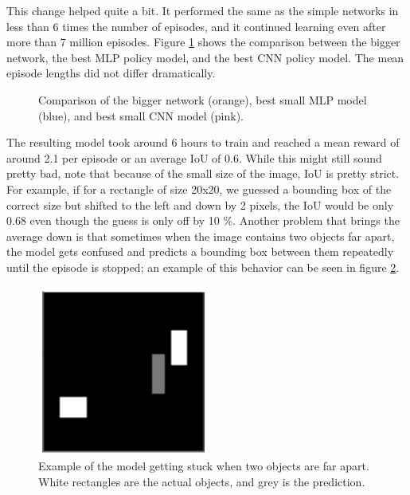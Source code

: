 \documentclass[
  digital,     %
  oneside,     %
  nosansbold,  %
  nocolorbold, %
  lof,         %
  lot,         %
]{fithesis4}
\begin{document}
This change helped quite a bit. It performed the same as the simple networks in less than 6 times the number of episodes, and it continued learning even after more than 7 million episodes. Figure \ref{fig:v3_bigger_net} shows the comparison between the bigger network, the best MLP policy model, and the best CNN policy model. The mean episode lengths did not differ dramatically.

\begin{figure}
    \centering
    \makebox[\textwidth][c]{}
    \caption{Comparison of the bigger network (orange), best small MLP model (blue), and best small CNN model (pink).}
    \label{fig:v3_bigger_net}
\end{figure}

The resulting model took around 6 hours to train and reached a mean reward of around 2.1 per episode or an average IoU of 0.6. While this might still sound pretty bad, note that because of the small size of the image, IoU is pretty strict. For example, if for a rectangle of size 20x20, we guessed a bounding box of the correct size but shifted to the left and down by 2 pixels, the IoU would be only 0.68 even though the guess is only off by 10  \%. Another problem that brings the average down is that sometimes when the image contains two objects far apart, the model gets confused and predicts a bounding box between them repeatedly until the episode is stopped; an example of this behavior can be seen in figure \ref{fig:v3_stuck}.

\begin{figure}
    \centering
    \includegraphics[width=0.5\linewidth]{results/v3_stuck.png}
    \caption{Example of the model getting stuck when two objects are far apart. White rectangles are the actual objects, and grey is the prediction.}
    \label{fig:v3_stuck}
\end{figure}
\end{document}
